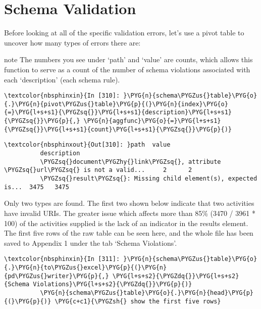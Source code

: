 \documentclass[letterpaper,10pt,english]{sphinxmanual}
\newenvironment{notice}{\begin{sphinxadmonition}}{\end{sphinxadmonition}}%
\begin{document}
\section{Schema Validation}
\label{\detokenize{Global Affairs Canada - Compliance Report:Schema-Validation}}
Before looking at all of the specific validation errors, let's use a
pivot table to uncover how many types of errors there are:

\begin{notice}{note}{}\unskip
The numbers you see under `path' and `value' are counts, which allows
this function to serve as a count of the number of schema violations
associated with each `description' (each schema rule).
\end{notice}

\begin{Verbatim}[commandchars=\\\{\}]
\textcolor{nbsphinxin}{In [310]: }\PYG{n}{schema\PYGZus{}table}\PYG{o}{.}\PYG{n}{pivot\PYGZus{}table}\PYG{p}{(}\PYG{n}{index}\PYG{o}{=}\PYG{l+s+s1}{\PYGZsq{}}\PYG{l+s+s1}{description}\PYG{l+s+s1}{\PYGZsq{}}\PYG{p}{,} \PYG{n}{aggfunc}\PYG{o}{=}\PYG{l+s+s1}{\PYGZsq{}}\PYG{l+s+s1}{count}\PYG{l+s+s1}{\PYGZsq{}}\PYG{p}{)}
\end{Verbatim}

\begin{Verbatim}[commandchars=\\\{\}]
\textcolor{nbsphinxout}{Out[310]: }path  value
          description
          \PYGZsq{}document\PYGZhy{}link\PYGZsq{}, attribute \PYGZsq{}url\PYGZsq{} is not a valid...     2      2
          \PYGZsq{}result\PYGZsq{}: Missing child element(s), expected is...  3475   3475
\end{Verbatim}

Only two types are found. The first two shown below indicate that two
activities have invalid URIs. The greater issue which affects more than
85\% (3470 / 3961 * 100) of the activities supplied is the lack of an
indicator in the results element. The first five rows of the raw table
can be seen here, and the whole file has been saved to Appendix 1 under
the tab `Schema Violations'.

\begin{Verbatim}[commandchars=\\\{\}]
\textcolor{nbsphinxin}{In [311]: }\PYG{n}{schema\PYGZus{}table}\PYG{o}{.}\PYG{n}{to\PYGZus{}excel}\PYG{p}{(}\PYG{n}{pd\PYGZus{}writer}\PYG{p}{,} \PYG{l+s+s2}{\PYGZdq{}}\PYG{l+s+s2}{Schema Violations}\PYG{l+s+s2}{\PYGZdq{}}\PYG{p}{)}
          \PYG{n}{schema\PYGZus{}table}\PYG{o}{.}\PYG{n}{head}\PYG{p}{(}\PYG{p}{)} \PYG{c+c1}{\PYGZsh{} show the first five rows}
\end{Verbatim}
\end{document}
